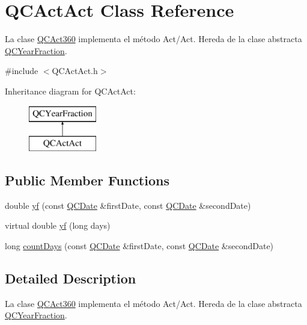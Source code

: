 \hypertarget{class_q_c_act_act}{\section{Q\+C\+Act\+Act Class Reference}
\label{class_q_c_act_act}
}


La clase \hyperlink{class_q_c_act360}{Q\+C\+Act360} implementa el método Act/\+Act. Hereda de la clase abstracta \hyperlink{class_q_c_year_fraction}{Q\+C\+Year\+Fraction}.  




{\ttfamily \#include $<$Q\+C\+Act\+Act.\+h$>$}

Inheritance diagram for Q\+C\+Act\+Act\+:\begin{figure}[H]
\begin{center}
\leavevmode
\includegraphics[height=2.000000cm]{class_q_c_act_act}
\end{center}
\end{figure}
\subsection*{Public Member Functions}
\begin{DoxyCompactItemize}
\item 
double \hyperlink{class_q_c_act_act_aa939d5d44744ffca64e36e3e9d2600bd}{yf} (const \hyperlink{class_q_c_date}{Q\+C\+Date} \&first\+Date, const \hyperlink{class_q_c_date}{Q\+C\+Date} \&second\+Date)
\item 
virtual double \hyperlink{class_q_c_act_act_ad22ae23fc988e029b70ac05db37b30fc}{yf} (long days)
\item 
long \hyperlink{class_q_c_act_act_a8d6cc524bd04550d07e1dc1f143e53e7}{count\+Days} (const \hyperlink{class_q_c_date}{Q\+C\+Date} \&first\+Date, const \hyperlink{class_q_c_date}{Q\+C\+Date} \&second\+Date)
\end{DoxyCompactItemize}


\subsection{Detailed Description}
La clase \hyperlink{class_q_c_act360}{Q\+C\+Act360} implementa el método Act/\+Act. Hereda de la clase abstracta \hyperlink{class_q_c_year_fraction}{Q\+C\+Year\+Fraction}. 


